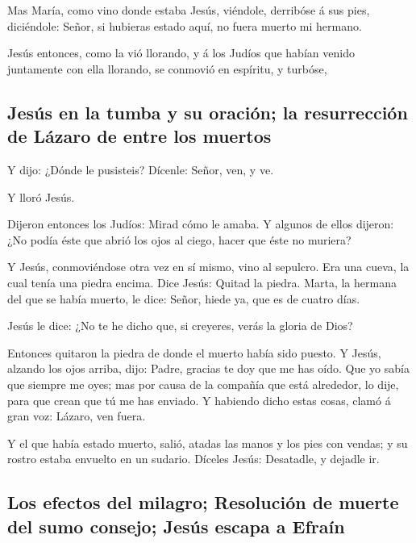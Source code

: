  Mas María, como vino donde estaba Jesús, viéndole,
derribóse á sus pies, diciéndole: Señor, si hubieras estado aquí, no
fuera muerto mi hermano.

 Jesús entonces, como la vió llorando, y á los Judíos que
habían venido juntamente con ella llorando, se conmovió en espíritu, y
turbóse,

\hypertarget{jesuxfas-en-la-tumba-y-su-oraciuxf3n-la-resurrecciuxf3n-de-luxe1zaro-de-entre-los-muertos}{%
\subsection{Jesús en la tumba y su oración; la resurrección de Lázaro de
entre los
muertos}\label{jesuxfas-en-la-tumba-y-su-oraciuxf3n-la-resurrecciuxf3n-de-luxe1zaro-de-entre-los-muertos}}

 Y dijo: ¿Dónde le pusisteis? Dícenle: Señor, ven, y ve.

 Y lloró Jesús.

 Dijeron entonces los Judíos: Mirad cómo le amaba.
 Y algunos de ellos dijeron: ¿No podía éste que abrió los
ojos al ciego, hacer que éste no muriera?

 Y Jesús, conmoviéndose otra vez en sí mismo, vino al
sepulcro. Era una cueva, la cual tenía una piedra encima.
 Dice Jesús: Quitad la piedra. Marta, la hermana del que
se había muerto, le dice: Señor, hiede ya, que es de cuatro días.

 Jesús le dice: ¿No te he dicho que, si creyeres, verás
la gloria de Dios?

 Entonces quitaron la piedra de donde el muerto había
sido puesto. Y Jesús, alzando los ojos arriba, dijo: Padre, gracias te
doy que me has oído.  Que yo sabía que siempre me oyes;
mas por causa de la compañía que está alrededor, lo dije, para que crean
que tú me has enviado.  Y habiendo dicho estas cosas,
clamó á gran voz: Lázaro, ven fuera.

 Y el que había estado muerto, salió, atadas las manos y
los pies con vendas; y su rostro estaba envuelto en un sudario. Díceles
Jesús: Desatadle, y dejadle ir.

\hypertarget{los-efectos-del-milagro-resoluciuxf3n-de-muerte-del-sumo-consejo-jesuxfas-escapa-a-efrauxedn}{%
\subsection{Los efectos del milagro; Resolución de muerte del sumo
consejo; Jesús escapa a
Efraín}\label{los-efectos-del-milagro-resoluciuxf3n-de-muerte-del-sumo-consejo-jesuxfas-escapa-a-efrauxedn}}


